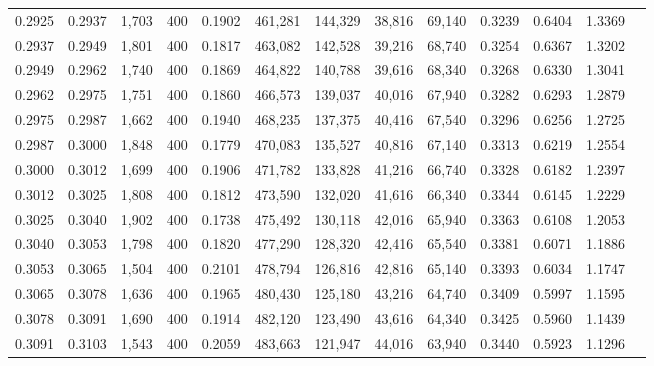 \begin{tabular}{rrrrrrrrrrrrr}
0.2925 & 0.2937 &  1,703 &   400 &                                     0.1902 & 461,281 & 144,329 &  38,816 &  69,140 & 0.3239 & 0.6404 & 1.3369 \\
0.2937 & 0.2949 &  1,801 &   400 &                                     0.1817 & 463,082 & 142,528 &  39,216 &  68,740 & 0.3254 & 0.6367 & 1.3202 \\
0.2949 & 0.2962 &  1,740 &   400 &                                     0.1869 & 464,822 & 140,788 &  39,616 &  68,340 & 0.3268 & 0.6330 & 1.3041 \\
0.2962 & 0.2975 &  1,751 &   400 &                                     0.1860 & 466,573 & 139,037 &  40,016 &  67,940 & 0.3282 & 0.6293 & 1.2879 \\
0.2975 & 0.2987 &  1,662 &   400 &                                     0.1940 & 468,235 & 137,375 &  40,416 &  67,540 & 0.3296 & 0.6256 & 1.2725 \\
0.2987 & 0.3000 &  1,848 &   400 &                                     0.1779 & 470,083 & 135,527 &  40,816 &  67,140 & 0.3313 & 0.6219 & 1.2554 \\
0.3000 & 0.3012 &  1,699 &   400 &                                     0.1906 & 471,782 & 133,828 &  41,216 &  66,740 & 0.3328 & 0.6182 & 1.2397 \\
0.3012 & 0.3025 &  1,808 &   400 &                                     0.1812 & 473,590 & 132,020 &  41,616 &  66,340 & 0.3344 & 0.6145 & 1.2229 \\
0.3025 & 0.3040 &  1,902 &   400 &                                     0.1738 & 475,492 & 130,118 &  42,016 &  65,940 & 0.3363 & 0.6108 & 1.2053 \\
0.3040 & 0.3053 &  1,798 &   400 &                                     0.1820 & 477,290 & 128,320 &  42,416 &  65,540 & 0.3381 & 0.6071 & 1.1886 \\
0.3053 & 0.3065 &  1,504 &   400 &                                     0.2101 & 478,794 & 126,816 &  42,816 &  65,140 & 0.3393 & 0.6034 & 1.1747 \\
0.3065 & 0.3078 &  1,636 &   400 &                                     0.1965 & 480,430 & 125,180 &  43,216 &  64,740 & 0.3409 & 0.5997 & 1.1595 \\
0.3078 & 0.3091 &  1,690 &   400 &                                     0.1914 & 482,120 & 123,490 &  43,616 &  64,340 & 0.3425 & 0.5960 & 1.1439 \\
0.3091 & 0.3103 &  1,543 &   400 &                                     0.2059 & 483,663 & 121,947 &  44,016 &  63,940 & 0.3440 & 0.5923 & 1.1296 \\

\end{tabular}
